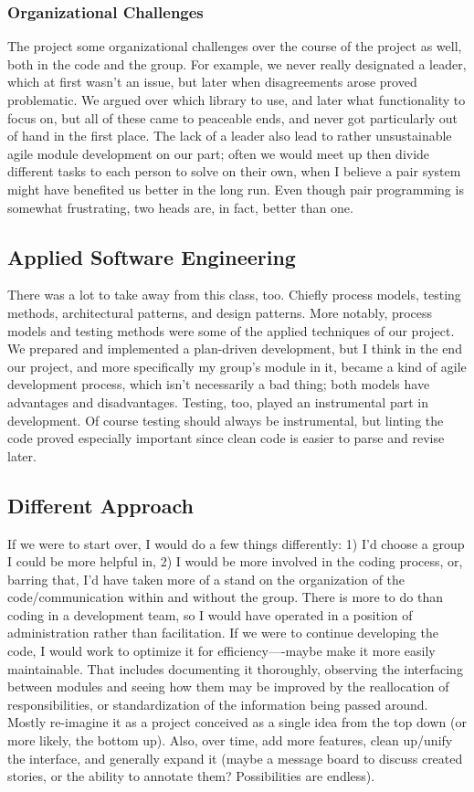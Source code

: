 \documentclass[a4paper]{article}
\begin{document}
\subsubsection{Organizational Challenges}
The project some organizational challenges over the course of the project as well, both in the code and the group. For example, we never really designated a leader, which at first wasn't an issue, but later when disagreements arose proved problematic. We argued over which library to use, and later what functionality to focus on, but all of these came to peaceable ends, and never got particularly out of hand in the first place. The lack of a leader also lead to rather unsustainable agile module development on our part; often we would meet up then divide different tasks to each person to solve on their own, when I believe a pair system might have benefited us better in the long run. Even though pair programming is somewhat frustrating, two heads are, in fact, better than one. 
\subsection{Applied Software Engineering}
There was a lot to take away from this class, too. Chiefly process models, testing methods, architectural patterns, and design patterns. More notably, process models and testing methods were some of the applied techniques of our project. We prepared and implemented a plan-driven development, but I think in the end our project, and more specifically my group's module in it, became a kind of agile development process, which isn't necessarily a bad thing; both models have advantages and disadvantages. Testing, too, played an instrumental part in development. Of course testing should always be instrumental, but linting the code proved especially important since clean code is easier to parse and revise later.
\subsection{Different Approach}
If we were to start over, I would do a few things differently: 1) I'd choose a group I could be more helpful in, 2) I would be more involved in the coding process, or, barring that, I'd have taken more of a stand on the organization of the code/communication within and without the group. There is more to do than coding in a development team, so I would have operated in a position of administration rather than facilitation. If we were to continue developing the code, I would work to optimize it for efficiency—-maybe make it more easily maintainable. That includes documenting it thoroughly, observing the interfacing between modules and seeing how them may be improved by the reallocation of responsibilities, or standardization of the information being passed around. Mostly re-imagine it as a project conceived as a single idea from the top down (or more likely, the bottom up). Also, over time, add more features, clean up/unify the interface, and generally expand it (maybe a message board to discuss created stories, or the ability to annotate them? Possibilities are endless).
\end{document}
